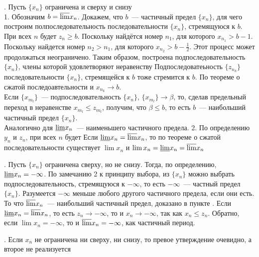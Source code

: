 \D {}. Пусть $\{x_n\}$ ограничена и сверху и снизу\\
1. Обозначим $b = \overline{\lim}x_n$. Докажем, что $b$~--- частичный предел $\{x_n\}$, для чего построим полпоследовательность последовательности $\{x_n\}$, стремящуюся к $b$. При всех $n$ будет $z_n \ge b$. Поскольку  найдётся номер $n_1$, для которого $x_{n_1} > b - 1$. Поскольку  найдется номер $n_2 > n_1$, для которого $x_{n_2} > b - \frac 12$. Этот процесс может продолжаться неограничено. Таким образом, построена подпоследовательность $\{x_n\}$, члены которой удовлетворяют неравенству  Подпоследоватеьность $\{z_{n_k}\}$ последовательности $\{x_n\}$, стремящейся к $b$ тоже стремится к $b$. По теореме о сжатой последоавтельности и $x_{n_k} \to b$.\\
Если $\{x_{m_l}\}$~--- подпоследовательность $\{x_n\}$, $\{x_{m_l}\} \to \beta$, то, сделав предельный переход в неравенстве $x_{m_l} \le z_{m_l}$, получим, что $\beta \le b$, то есть $b$~--- наибольший частичный предел $\{x_n\}$.\\
Аналогично для $\underline{\lim} x_n$~--- наименьшего частичного предела.
2. По определению $y_n$ и $z_n$, при всех $n$ будет  Если $\underline{\lim} x_n = \overline{\lim} x_n$, то по теореме о сжатой последовательности существует $\lim x_n$ и $\lim x_n = \underline{\lim} x_n = \overline{\lim} x_n$

. Пусть $\{x_n\}$ ограничена сверху, но не снизу. Тогда, по определению, $\underline{\lim} x_n = -\infty$. По замечанию 2 к принципу выбора, из $\{x_n\}$ можно выбрать подпоследовательность, стремящуюся к $-\infty$, то есть $-\infty$~--- частный предел $\{x_n\}$. Разумеется $-\infty$ меньше любого другого частичного предела, если они есть. То что $\overline{\lim} x_n$~--- наибольший частичный предел, доказано в пункте . Если $\underline{\lim} x_n = \overline{\lim} x_n$, то есть $z_n \to -\infty$, то и $x_n \to -\infty$, так как $x_n \le z_n$. Обратно, если $\lim x_n = -\infty$, то и $\overline{\lim} x_n = -\infty$, как частичный период.

. Если $x_n$ не ограничена ни сверху, ни снизу, то превое утверждение очевидно, а второе не реализуется